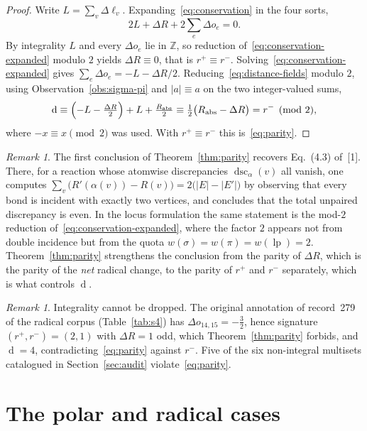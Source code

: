 \documentclass[11pt]{article}
\numberwithin{equation}{section}
\newcommand{\lp}{\operatorname{lp}}
\newcommand{\del}{\operatorname{d}}
\newcommand{\dsc}{\operatorname{dsc}}
\theoremstyle{plain}
\theoremstyle{definition}
\theoremstyle{remark}
\newtheorem{remark}[theorem]{Remark}
\begin{document}
\begin{proof}
Write $L=\sum_v\Delta\ell_v$.  Expanding~\eqref{eq:conservation} in the four
sorts,
\begin{equation}
  2L+\Delta R+2\sum_e\Delta o_e=0 .
  \label{eq:conservation-expanded}
\end{equation}
By integrality $L$ and every $\Delta o_e$ lie in $\mathbb Z$, so reduction
of~\eqref{eq:conservation-expanded} modulo $2$ yields $\Delta R\equiv0$, that
is $r^+\equiv r^-$.  Solving~\eqref{eq:conservation-expanded} gives
$\sum_e\Delta o_e=-L-\Delta R/2$.  Reducing~\eqref{eq:distance-fields} modulo
$2$, using Observation~\ref{obs:sigma-pi} and $|a|\equiv a$ on the two
integer-valued sums,
\[
  \del\equiv\Bigl(-L-\tfrac{\Delta R}{2}\Bigr)+L+\tfrac{R_{\mathrm{abs}}}{2}
    \equiv\tfrac12\bigl(R_{\mathrm{abs}}-\Delta R\bigr)=r^-\pmod2 ,
\]
where $-x\equiv x\pmod 2$ was used.  With $r^+\equiv r^-$ this
is~\eqref{eq:parity}.
\end{proof}

\begin{remark}
\label{rem:heg-43}
The first conclusion of Theorem~\ref{thm:parity} recovers Eq.~(4.3) of~[1].
There, for a reaction whose atomwise discrepancies $\dsc_\alpha(v)$ all
vanish, one computes
$\sum_{v}\bigl(R'(\alpha(v))-R(v)\bigr)=2\bigl(|E|-|E'|\bigr)$ by observing
that every bond is incident with exactly two vertices, and concludes that the
total unpaired discrepancy is even.  In the locus formulation the same
statement is the mod-$2$ reduction of~\eqref{eq:conservation-expanded}, where
the factor $2$ appears not from double incidence but from the quota
$w(\sigma)=w(\pi)=w(\lp)=2$.  Theorem~\ref{thm:parity} strengthens the
conclusion from the parity of $\Delta R$, which is the parity of the
\emph{net} radical change, to the parity of $r^+$ and $r^-$ separately, which
is what controls $\del$.
\end{remark}

\begin{remark}
\label{rem:parity-needs-integrality}
Integrality cannot be dropped.  The original annotation of record~279 of the
radical corpus (Table~\ref{tab:s4}) has $\Delta o_{14,15}=-\tfrac32$, hence
signature $(r^+,r^-)=(2,1)$ with $\Delta R=1$ odd, which
Theorem~\ref{thm:parity} forbids, and $\del=4$, contradicting~\eqref{eq:parity}
against $r^-$.  Five of the six non-integral multisets catalogued in
Section~\ref{sec:audit} violate~\eqref{eq:parity}.
\end{remark}

\section{The polar and radical cases}
\label{sec:dichotomy}
\end{document}
